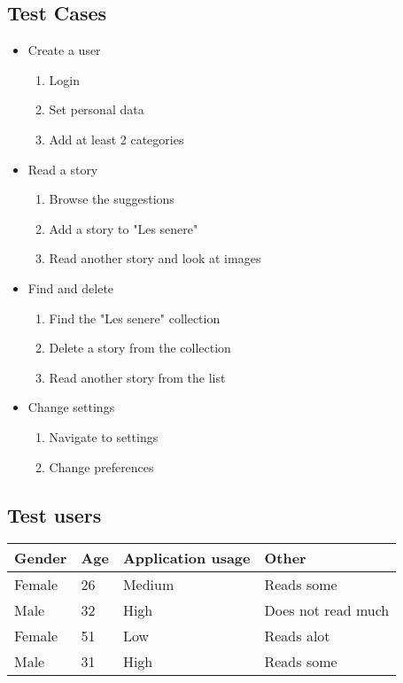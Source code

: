 			\subsection{Test Cases}
			
			\begin{itemize}
				\item Create a user 	
				\begin{enumerate}
					\item Login 
					\item Set personal data 
					\item Add at least 2 categories 
				\end{enumerate}
				\item Read a story 
				\begin{enumerate}
					\item Browse the suggestions 
					\item Add a story to "Les senere" 
					\item Read another story and look at images 
				\end{enumerate}
				\item Find and delete 
				\begin{enumerate}
					\item Find the "Les senere" collection
					\item Delete a story from the collection
					\item Read another story from the list 
				\end{enumerate}
				\item Change settings 
				\begin{enumerate}
					\item Navigate to settings 
					\item Change preferences 
				\end{enumerate}
				
			\end{itemize}
			
			\subsection{Test users}
			
			\begin{table}[H]
				\begin{center}
					\begin{tabular}{ | l | l | l | l |}
						\hline
						\textbf{Gender} & \textbf{Age} & \textbf{Application usage} & \textbf{Other} \\ \hline
						Female & 26 & Medium & Reads some \\\hline
						Male & 32 & High & Does not read much \\\hline
						Female & 51 & Low & Reads alot \\\hline
						Male & 31 & High & Reads some \\\hline 
						
					\end{tabular}
				\end{center}
			\end{table}
			
